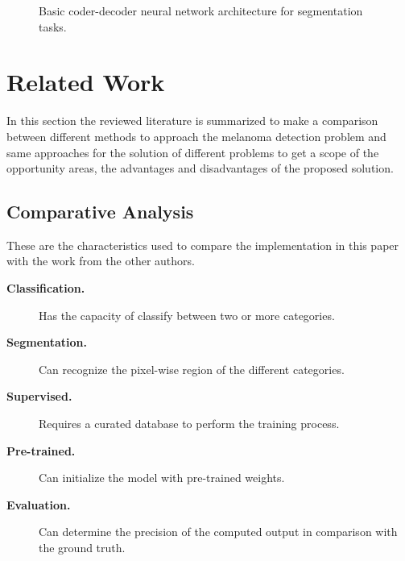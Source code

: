 \begin{figure}[h]
{%
  }
  \caption{Basic coder-decoder neural network architecture for segmentation tasks.}
\end{figure}

\section{Related Work}
In this section the reviewed literature is summarized to make a comparison between different methods to approach the melanoma detection problem and same approaches for the solution of different problems to get a scope of the opportunity areas, the advantages and disadvantages of the proposed solution.

\subsection{Comparative Analysis}

These are the characteristics used to compare the implementation in this paper with the work from the other authors.
\begin{description}
  \item[\textbf{Classification.}] Has the capacity of classify between two or more categories.
  \item[\textbf{Segmentation.}] Can recognize the pixel-wise region of the different categories.
  \item[\textbf{Supervised.}] Requires a curated database to perform the training process.
  \item[\textbf{Pre-trained.}] Can initialize the model with pre-trained weights.
  \item[\textbf{Evaluation.}] Can determine the precision of the computed output in comparison with the ground truth.     
\end{description}


